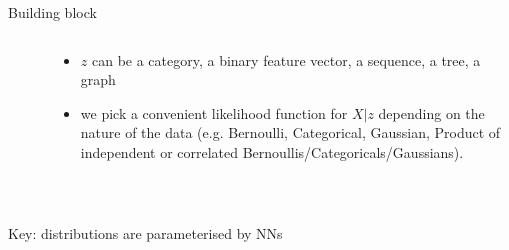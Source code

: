 \begin{frame}{Building block}

	\begin{columns}
	\begin{column}{0.15\textwidth}
    \end{column}
    ~
    \begin{column}{0.75\textwidth}
    	\begin{itemize}
			\item $z$ can be a category, a binary feature vector, a sequence, a tree, a graph 
			\item we pick a convenient likelihood function for $X|z$ depending on the nature of the data (e.g. Bernoulli, Categorical, Gaussian, Product of independent or correlated Bernoullis/Categoricals/Gaussians). 
		\end{itemize}
    \end{column}
    \end{columns}
    
    ~
    
    \alert{Key: distributions are parameterised by NNs}
\end{frame}